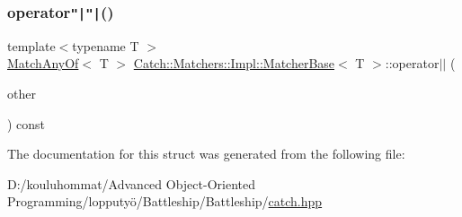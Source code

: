 \mbox{\label{struct_catch_1_1_matchers_1_1_impl_1_1_matcher_base_a5f8542b8f1567a6f9c65d0a6da7b679b}} 
\subsubsection{\texorpdfstring{operator\texttt{"|}\texttt{"|}()}{operator||()}}
{\footnotesize\ttfamily template$<$typename T $>$ \\
\mbox{\hyperlink{struct_catch_1_1_matchers_1_1_impl_1_1_match_any_of}{Match\+Any\+Of}}$<$ T $>$ \mbox{\hyperlink{struct_catch_1_1_matchers_1_1_impl_1_1_matcher_base}{Catch\+::\+Matchers\+::\+Impl\+::\+Matcher\+Base}}$<$ T $>$\+::operator$\vert$$\vert$ (\begin{DoxyParamCaption}\item[{\mbox{\hyperlink{struct_catch_1_1_matchers_1_1_impl_1_1_matcher_base}{Matcher\+Base}}$<$ T $>$ const \&}]{other }\end{DoxyParamCaption}) const}



The documentation for this struct was generated from the following file\+:\begin{DoxyCompactItemize}
\item 
D\+:/kouluhommat/\+Advanced Object-\/\+Oriented Programming/lopputyö/\+Battleship/\+Battleship/\mbox{\hyperlink{catch_8hpp}{catch.\+hpp}}\end{DoxyCompactItemize}
